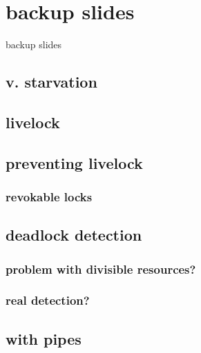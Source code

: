

\section{backup slides}
\begin{frame}{}
\end{frame}
\begin{frame}{backup slides}
\end{frame}

\subsection{v. starvation}


\subsection{livelock}


\subsection{preventing livelock}


\subsubsection{revokable locks}


\subsection{deadlock detection}


\subsubsection{problem with divisible resources?}


\subsubsection{real detection?}



\subsection{with pipes}


